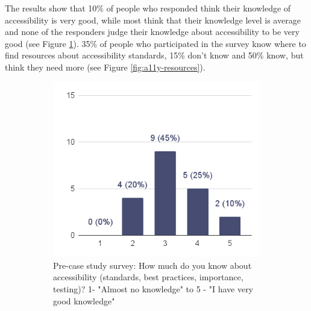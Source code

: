 \documentclass{master_thesis}
\begin{document}
The results show that 10\% of people who responded think their knowledge of accessibility is very good, while most think that their knowledge level is average and none of the responders judge their knowledge about accessibility to be very good (see Figure \ref{fig:a11y-knowledge-current}). 35\% of people who participated in the survey know where to find resources about accessibility standards, 15\% don't know and 50\% know, but think they need more (see Figure \ref{fig:a11y-resources}).

\begin{figure}[H]
    \centering
	\begin{subfigure}{0.5\textwidth}
		\includegraphics[width=\textwidth]{img/a11y-knowledge.png}
		\caption{Pre-case study survey: How much do you know about accessibility (standards, best practices, importance, testing)? 1- "Almost no knowledge" to 5 - "I have very good knowledge" }
		\label{fig:a11y-knowledge-current}
	\end{subfigure}
	\hspace{0.05\textwidth}
	\begin{subfigure}{0.4\textwidth}

\end{subfigure}
\end{figure}
\end{document}
